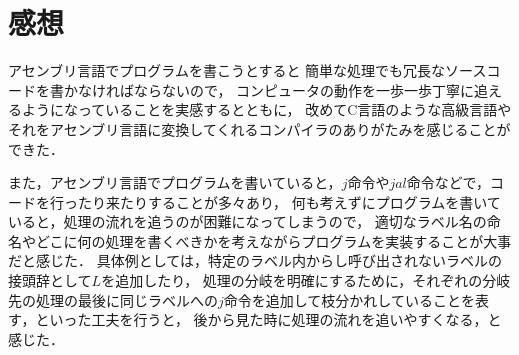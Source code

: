 \documentclass[a4j,11pt]{jarticle}
\begin{document}
\section{感想}
アセンブリ言語でプログラムを書こうとすると
簡単な処理でも冗長なソースコードを書かなければならないので，
コンピュータの動作を一歩一歩丁寧に追えるようになっていることを実感するとともに，
改めてC言語のような高級言語やそれをアセンブリ言語に変換してくれるコンパイラのありがたみを感じることができた．

また，アセンブリ言語でプログラムを書いていると，$j$命令や$jal$命令などで，コードを行ったり来たりすることが多々あり，
何も考えずにプログラムを書いていると，処理の流れを追うのが困難になってしまうので，
適切なラベル名の命名やどこに何の処理を書くべきかを考えながらプログラムを実装することが大事だと感じた．
具体例としては，特定のラベル内からし呼び出されないラベルの接頭辞として$L$を追加したり，
処理の分岐を明確にするために，それぞれの分岐先の処理の最後に同じラベルへの$j$命令を追加して枝分かれしていることを表す，といった工夫を行うと，
後から見た時に処理の流れを追いやすくなる，と感じた．
\end{document}

